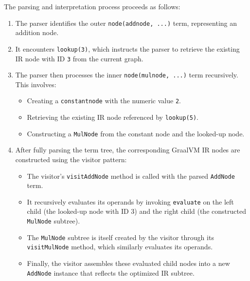The parsing and interpretation process proceeds as follows:

\begin{enumerate}
    \item The parser identifies the outer \texttt{node(addnode, ...)} term, representing an addition node.
    \item It encounters \texttt{lookup(3)}, which instructs the parser to retrieve the existing IR node with ID \texttt{3} from the current graph.
    \item The parser then processes the inner \texttt{node(mulnode, ...)} term recursively. This involves:
    \begin{itemize}
        \item Creating a \texttt{constantnode} with the numeric value \texttt{2}.
        \item Retrieving the existing IR node referenced by \texttt{lookup(5)}.
        \item Constructing a \texttt{MulNode} from the constant node and the looked-up node.
    \end{itemize}
    \item After fully parsing the term tree, the corresponding GraalVM IR nodes are constructed using the visitor pattern:
    \begin{itemize}
        \item The visitor’s \texttt{visitAddNode} method is called with the parsed \texttt{AddNode} term.
        \item It recursively evaluates its operands by invoking \texttt{evaluate} on the left child (the looked-up node with ID 3) and the right child (the constructed \texttt{MulNode} subtree).
        \item The \texttt{MulNode} subtree is itself created by the visitor through its \texttt{visitMulNode} method, which similarly evaluates its operands.
        \item Finally, the visitor assembles these evaluated child nodes into a new \texttt{AddNode} instance that reflects the optimized IR subtree.
    \end{itemize}
\end{enumerate}
